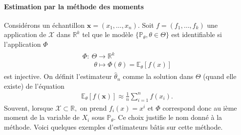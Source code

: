 \documentclass[letterpaper,11pt,english]{sphinxmanual}
\begin{document}
\paragraph{Estimation par la méthode des moments}
\label{\detokenize{chapter2:estimation-par-la-methode-des-moments}}
\sphinxAtStartPar
Considérons un échantillon \(\mathbf{x} = (x_1,\dots,x_n)\). Soit
\(f = (f_1,\dots,f_k)\) une application de \(\mathcal{X}\) dans
\(\mathbb{R}^k\) tel que le modèle
\(\{\mathbb{P}_{\theta},\theta\in\Theta\}\) est identifiable si
l’application \(\Phi\)
\begin{equation}\label{equation:chapter2:chapter2:64}
\begin{split}\begin{array}{l}
\Phi: ~\Theta \rightarrow \mathbb{R}^k \\
\quad ~~~\theta \mapsto \Phi(\theta) = \mathbb{E}_{\theta}[f(x)]
\end{array}\end{split}
\end{equation}
\sphinxAtStartPar
est injective. On définit l’estimateur \(\hat{\theta}_n\) comme la
solution dans \(\Theta\) (quand elle existe) de l’équation
\begin{equation}\label{equation:chapter2:chapter2:65}
\begin{split}\mathbb{E}_{\theta}[f(\mathbf{x})]\approx \frac{1}{n}\sum_{i=1}^{n} f(x_i).\end{split}
\end{equation}
\sphinxAtStartPar
Souvent, lorsque \(\mathcal{X}\subset \mathbb{R},\) on prend
\(f_i(x) = x^i\) et \(\Phi\) correspond donc au ième moment de
la variable de \(X_i\) sous \(\mathbb{P}_{\theta}\). Ce choix
justifie le nom donné à la méthode. Voici quelques exemples
d’estimateurs bâtis sur cette méthode.
\end{document}
